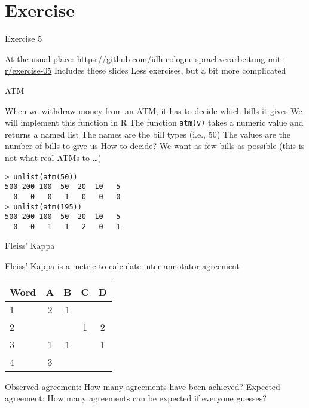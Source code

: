 \documentclass[aspectratio=169]{beamer}
\begin{document}
\section{Exercise}

\begin{frame}{Exercise 5}
\begin{outline}
\1 At the usual place: \url{https://github.com/idh-cologne-sprachverarbeitung-mit-r/exercise-05}
\2 Includes these slides
\1 Less exercises, but a bit more complicated
\end{outline}
\end{frame}

\begin{frame}[fragile]{ATM}
\begin{outline}
\1 When we withdraw money from an ATM, it has to decide which bills it gives
\1 We will implement this function in R
\1 The function \lstinline!atm(v)! takes a numeric value and returns a named list
\2 The names are the bill types (i.e., 50)
\2 The values are the number of bills to give us
\1 How to decide?
\2 We want as few bills as possible (this is not what real ATMs to \dots)
\end{outline}
\pause
\begin{example}
\begin{lstlisting}
> unlist(atm(50))
500 200 100  50  20  10   5 
  0   0   0   1   0   0   0 
> unlist(atm(195))
500 200 100  50  20  10   5 
  0   0   1   1   2   0   1 
\end{lstlisting}
\end{example}
\end{frame}

\begin{frame}{Fleiss' Kappa}
\begin{outline}
\1 Fleiss' Kappa is a metric to calculate inter-annotator agreement
\begin{tabular}{lcccc}
\toprule
Word & A & B & C & D \\
\midrule
1 & 2 & 1 &   &   \\
2 &   &   & 1 & 2 \\
3 & 1 & 1 &   & 1 \\
4 & 3 &   &   &   \\
\bottomrule
\end{tabular}
\1 Observed agreement: How many agreements have been achieved?
\1 Expected agreement: How many agreements can be expected if everyone guesses?
\end{outline}
\end{frame}
\end{document}
